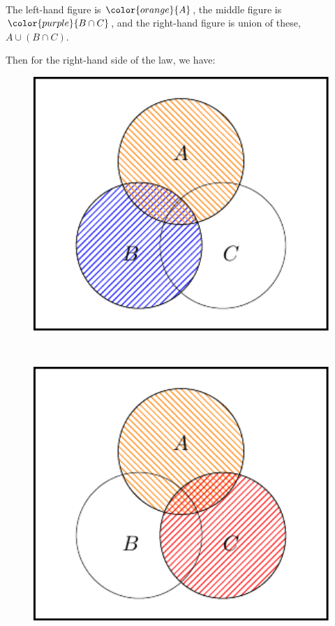 \documentclass[
  letterpaper,
]{report}
\theoremstyle{definition}
\theoremstyle{definition}
\theoremstyle{remark}
\begin{document}
~

The left-hand figure is \(\color{orange}{A}\), the middle figure is
\(\color{purple}{B\cap C}\), and the right-hand figure is union of
these, \(A\cup (B\cap C)\).

Then for the right-hand side of the law, we have:

\begin{figure}

{\centering \includegraphics[width=1\textwidth,height=\textheight]{sections/L03-events_files/figure-pdf/dist4-1.pdf}

}

\end{figure}

~

\begin{figure}

{\centering \includegraphics[width=1\textwidth,height=\textheight]{sections/L03-events_files/figure-pdf/dist5-1.pdf}

}

\end{figure}
\end{document}
